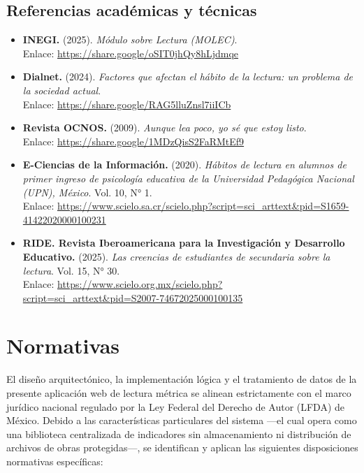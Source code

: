 \documentclass[12pt, atypical, journal]{article}
\begin{document}
\subsection{Referencias académicas y técnicas}
\begin{itemize}
	\item \textbf{INEGI.} (2025). \textit{Módulo sobre Lectura (MOLEC)}. \\
	Enlace: \url{https://share.google/oSIT0jhQy8hLjdmqe}
	
	\item \textbf{Dialnet.} (2024). \textit{Factores que afectan el hábito de la lectura: un problema de la sociedad actual}. \\
	Enlace: \url{https://share.google/RAG5lluZnsl7iiICb}
	
	\item \textbf{Revista OCNOS.} (2009). \textit{Aunque lea poco, yo sé que estoy listo}. \\
	Enlace: \url{https://share.google/1MDzQisS2FaRMtEf9}
	
	\item \textbf{E-Ciencias de la Información.} (2020). \textit{Hábitos de lectura en alumnos de primer ingreso de psicología educativa de la Universidad Pedagógica Nacional (UPN), México}. Vol. 10, N° 1. \\
	Enlace: \url{https://www.scielo.sa.cr/scielo.php?script=sci_arttext&pid=S1659-41422020000100231}
	
	\item \textbf{RIDE. Revista Iberoamericana para la Investigación y Desarrollo Educativo.} (2025). \textit{Las creencias de estudiantes de secundaria sobre la lectura}. Vol. 15, N° 30. \\
	Enlace: \url{https://www.scielo.org.mx/scielo.php?script=sci_arttext&pid=S2007-74672025000100135}
\end{itemize}

\newpage

\section{Normativas}
El diseño arquitectónico, la implementación lógica y el tratamiento de datos de la presente aplicación web de lectura métrica se alinean estrictamente con el marco jurídico nacional regulado por la Ley Federal del Derecho de Autor (LFDA) de México. Debido a las características particulares del sistema ---el cual opera como una biblioteca centralizada de indicadores sin almacenamiento ni distribución de archivos de obras protegidas---, se identifican y aplican las siguientes disposiciones normativas específicas:
\end{document}
